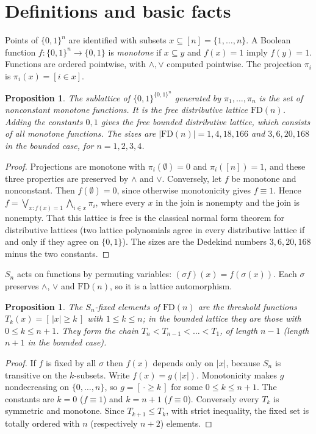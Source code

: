 \documentclass[11pt]{article}
\newtheorem{proposition}[theorem]{Proposition}
\theoremstyle{definition}
\theoremstyle{remark}
\newcommand{\FD}{\mathrm{FD}}
\begin{document}
\section{Definitions and basic facts}
Points of $\{0,1\}^n$ are identified with subsets $x\subseteq[n]=\{1,\dots,n\}$.
A Boolean function $f:\{0,1\}^n\to\{0,1\}$ is \emph{monotone} if $x\subseteq y$
and $f(x)=1$ imply $f(y)=1$. Functions are ordered pointwise, with $\wedge,\vee$
computed pointwise. The projection $\pi_i$ is $\pi_i(x)=[i\in x]$.

\begin{proposition}\label{prop:fd}
The sublattice of $\{0,1\}^{\{0,1\}^n}$ generated by $\pi_1,\dots,\pi_n$ is the
set of nonconstant monotone functions. It is the free distributive lattice
$\FD(n)$. Adding the constants $0,1$ gives the free bounded distributive
lattice, which consists of all monotone functions. The sizes are
$|\FD(n)|=1,4,18,166$ and $3,6,20,168$ in the bounded case, for $n=1,2,3,4$.
\end{proposition}
\begin{proof}
Projections are monotone with $\pi_i(\emptyset)=0$ and $\pi_i([n])=1$, and these
three properties are preserved by $\wedge$ and $\vee$. Conversely, let $f$ be
monotone and nonconstant. Then $f(\emptyset)=0$, since otherwise monotonicity
gives $f\equiv1$. Hence $f=\bigvee_{x:f(x)=1}\bigwedge_{i\in x}\pi_i$, where
every $x$ in the join is nonempty and the join is nonempty. That this lattice is
free is the classical normal form theorem for distributive lattices (two lattice
polynomials agree in every distributive lattice if and only if they agree on
$\{0,1\}$). The sizes are the Dedekind numbers $3,6,20,168$ minus the two
constants.
\end{proof}

$S_n$ acts on functions by permuting variables: $(\sigma f)(x)=f(\sigma(x))$.
Each $\sigma$ preserves $\wedge$, $\vee$ and $\FD(n)$, so it is a lattice
automorphism.

\begin{proposition}\label{prop:fix}
The $S_n$-fixed elements of $\FD(n)$ are the threshold functions
$T_k(x)=[\,|x|\ge k\,]$ with $1\le k\le n$; in the bounded lattice they are those
with $0\le k\le n+1$. They form the chain $T_n<T_{n-1}<\dots<T_1$, of length
$n-1$ (length $n+1$ in the bounded case).
\end{proposition}
\begin{proof}
If $f$ is fixed by all $\sigma$ then $f(x)$ depends only on $|x|$, because $S_n$
is transitive on the $k$-subsets. Write $f(x)=g(|x|)$. Monotonicity makes $g$
nondecreasing on $\{0,\dots,n\}$, so $g=[\,\cdot\ge k\,]$ for some
$0\le k\le n+1$. The constants are $k=0$ ($f\equiv1$) and $k=n+1$ ($f\equiv0$).
Conversely every $T_k$ is symmetric and monotone. Since $T_{k+1}\le T_k$, with
strict inequality, the fixed set is totally ordered with $n$ (respectively $n+2$)
elements.
\end{proof}
\end{document}
